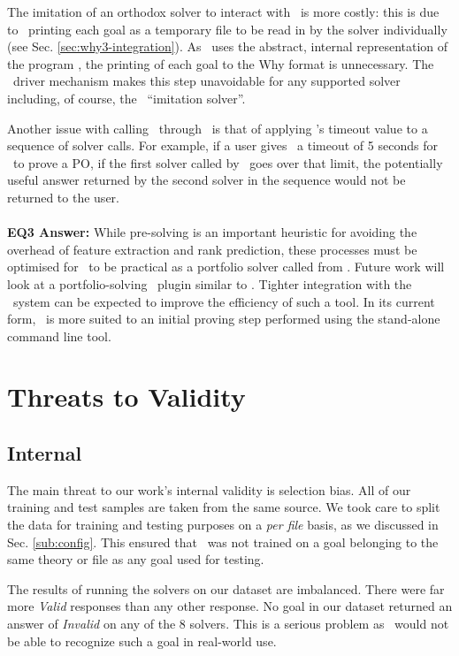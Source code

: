 The imitation of an orthodox solver to interact with \why~is more costly: this is due to \why~printing each goal as a temporary file to be read in by the solver individually (see Sec. \ref{sec:why3-integration}). 
As \where~uses the abstract, internal representation of the program
, the printing of each goal to the Why format is unnecessary.
The \why~driver mechanism makes this step unavoidable for any supported solver including, of course, the \where~``imitation solver''.

Another issue with calling \where~through \why~is that of applying \why's timeout value to a sequence of solver calls. 
For example, if a user gives \why~a timeout of 5 seconds for \where~to prove a PO, if the first solver called by \where~goes over that limit, the potentially useful answer returned by the second solver in the sequence would not be returned to the user. \\
\\
\textbf{EQ3 Answer:}
While pre-solving is an important heuristic for avoiding the overhead of feature extraction and rank prediction, these processes must be optimised for \where~to be practical as a portfolio solver called from \why.   
Future work will look at a portfolio-solving \why~plugin similar to \where. Tighter integration with the \why~system can be expected to improve the efficiency of such a tool.      
In its current form, \where~is more suited to an initial proving step performed using the stand-alone command line tool.

\section{Threats to Validity}
\label{sec:threats}

\subsection{Internal}

The main threat to our work's internal validity is selection bias. All of our training and test samples are taken from the same source. 
We took care to split the data for training and testing purposes on a \textit{per file} basis, as we discussed in Sec. \ref{sub:config}. 
This ensured that \where~was not trained on a goal belonging to the same theory or file as any goal used for testing.
 
The results of running the solvers on our dataset are imbalanced. There were far more \textit{Valid} responses than any other response. 
No goal in our dataset returned an answer of \textit{Invalid} on any of the 8 solvers. 
This is a serious problem as \where~would not be able to recognize such a goal in real-world use. 

